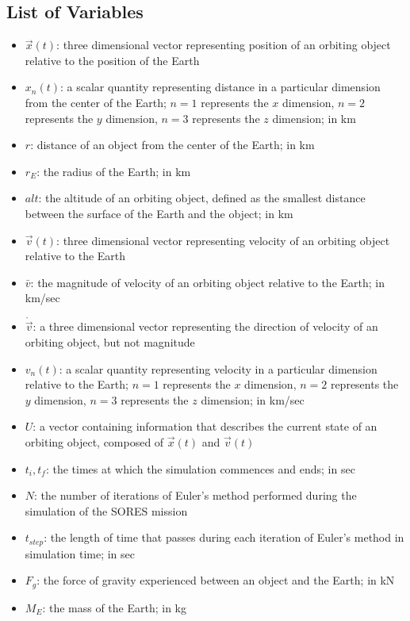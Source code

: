 \documentclass[12pt]{scrartcl}
\begin{document}
\subsection{List of Variables}
\begin{itemize}
    \item $\vec{x}(t)$: three dimensional vector representing  position of an orbiting object relative to the position of the Earth
    \item $x_n(t)$: a scalar quantity representing distance in a particular dimension from the center of the Earth; $n=1$ represents the $x$ dimension, $n=2$ represents the $y$ dimension, $n=3$ represents the $z$ dimension; in km
    \item $r$: distance of an object from the center of the Earth; in km
    \item $r_E$: the radius of the Earth; in km
    \item $\mathit{alt}$: the altitude of an orbiting object, defined as the smallest distance between the surface of the Earth and the object; in km
    \item $\vec{v}(t)$: three dimensional vector representing  velocity of an orbiting object relative to the Earth
    \item $\bar{v}$: the magnitude of velocity of an orbiting object relative to the Earth; in km/sec
    \item $\mathring{\vec{v}}$: a three dimensional vector representing the direction of velocity of an orbiting object, but not magnitude
    \item $v_n(t)$: a scalar quantity representing velocity in a particular dimension relative to the Earth; $n=1$ represents the $x$ dimension, $n=2$ represents the $y$ dimension, $n=3$ represents the $z$ dimension; in km/sec
    \item $U$: a vector containing information that describes the current state of an orbiting object, composed of $\vec{x}(t)$ and $\vec{v}(t)$
    \item $t_{i}, t_{f}$: the times at which the simulation commences and ends; in sec
    \item $N$: the number of iterations of Euler's method performed during the simulation of the SORES mission
    \item $t_{\mathit{step}}$: the length of time that passes during each iteration of Euler's method in simulation time; in sec
    \item $F_{g}$: the force of gravity experienced between an object and the Earth; in kN
    \item $M_E$: the mass of the Earth; in kg

\end{itemize}
\end{document}
